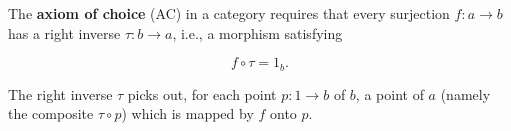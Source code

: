 The \textbf{axiom of choice} (AC) in a category requires that every surjection $f : a \to b$ has a right inverse $\tau : b \to a$, i.e., a morphism satisfying

$$f \circ \tau = 1_b.$$

The right inverse $\tau$ picks out, for each point $p : 1 \to b$ of $b$, a point of $a$ (namely the composite $\tau \circ p$) which is mapped by $f$ onto $p$.
